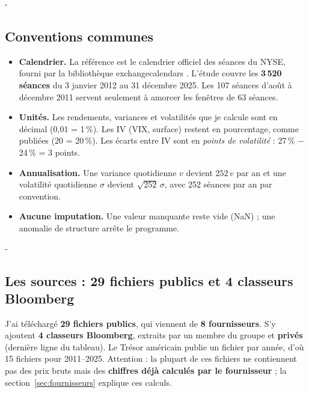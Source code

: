 \documentclass[10pt,a4paper]{article}
\makeatletter
\newcommand{\besoin}[1]{\par\penalty-100\begingroup\setlength{\dimen@}{#1}%
  \dimen@ii\pagegoal\advance\dimen@ii-\pagetotal
  \ifdim\dimen@>\dimen@ii\ifdim\dimen@ii>\z@\vfil\fi\break\fi\endgroup}
\let\soussectionorigine\subsection
\renewcommand{\subsection}{\besoin{5\baselineskip}\soussectionorigine}
\newcommand{\coupure}{\textunderscore\allowbreak}
\newcommand{\fic}[1]{{\small\ttfamily\let\_\coupure #1}}
\makeatother
\begin{document}
\subsection{Conventions communes}
\begin{itemize}
\item \textbf{Calendrier.} La référence est le calendrier officiel des séances du NYSE, fourni par la bibliothèque \fic{exchange\_calendars} \cite{xcals}. L'étude couvre les \textbf{3\,520 séances} du 3 janvier 2012 au 31 décembre 2025. Les 107 séances d'août à décembre 2011 servent seulement à amorcer les fenêtres de 63 séances.
\item \textbf{Unités.} Les rendements, variances et volatilités que je calcule sont en décimal (0,01 = 1\,\%). Les IV (VIX, surface) restent en pourcentage, comme publiées (20 = 20\,\%). Les écarts entre IV sont en \emph{points de volatilité} : 27\,\% − 24\,\% = 3 points.
\item \textbf{Annualisation.} Une variance quotidienne $v$ devient $252\,v$ par an et une volatilité quotidienne $\sigma$ devient $\sqrt{252}\,\sigma$, avec 252 séances par an par convention.
\item \textbf{Aucune imputation.} Une valeur manquante reste vide (NaN) ; une anomalie de structure arrête le programme.
\end{itemize}

\subsection{Les sources : 29 fichiers publics et 4 classeurs Bloomberg}
J'ai téléchargé \textbf{29 fichiers publics}, qui viennent de \textbf{8 fournisseurs}. S'y ajoutent \textbf{4 classeurs Bloomberg}, extraits par un membre du groupe et \textbf{privés} (dernière ligne du tableau). Le Trésor américain publie un fichier par année, d'où 15 fichiers pour 2011–2025. Attention : la plupart de ces fichiers ne contiennent pas des prix bruts mais des \textbf{chiffres déjà calculés par le fournisseur} ; la section~\ref{sec:fournisseurs} explique ces calculs.
\end{document}
